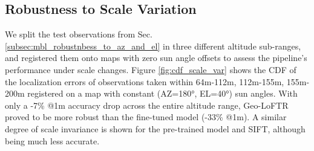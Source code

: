 


\subsection{Robustness to Scale Variation}
\label{subsec:mbl_robustnbess_to_scale}

We split the test observations from Sec. \ref{subsec:mbl_robustnbess_to_az_and_el} in three different altitude sub-ranges, and registered them onto maps with zero sun angle offsets to assess the pipeline's performance under scale changes. Figure \ref{fig:cdf_scale_var} shows the CDF of the localization errors of observations taken within 64m-112m, 112m-155m, 155m-200m registered on a map with constant (AZ=180°, EL=40°) sun angles. With only a -7\% @1m accuracy drop across the entire altitude range, Geo-LoFTR proved to be more robust than the fine-tuned model (-33\% @1m). A similar degree of scale invariance is shown for the pre-trained model and SIFT, although being much less accurate.  


